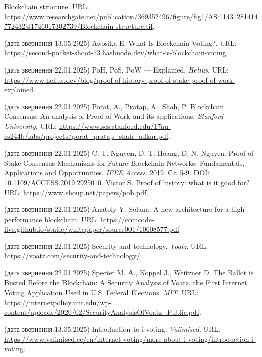 \documentclass[14pt]{extreport}
\begin{document}
  \renewcommand\bibname{\MakeUppercase{Список літератури}}
  \begin{thebibliography}{99}
     Blockchain structure. URL: \url{https://www.researchgate.net/publication/369352496/figure/fig1/AS:11431281414772432@1746017302739/Blockchain-structure.tif}.

    (дата звернення 13.05.2025)
     Awosika E. What Is Blockchain Voting?. URL: \url{https://second-pocket-shoot-73.hashnode.dev/what-is-blockchain-voting}.

    (дата звернення 22.01.2025)
     PoH, PoS, PoW — Explained. \textit{Helius}. URL: \url{https://www.helius.dev/blog/proof-of-history-proof-of-stake-proof-of-work-explained}.
    
    (дата звернення 22.01.2025)
     Porat, A., Pratap, A., Shah, P. Blockchain Consensus: An analysis of Proof-of-Work and its applications. \textit{Stanford University}. URL: \url{https://www.scs.stanford.edu/17au-cs244b/labs/projects/porat_pratap_shah_adkar.pdf}.
    
    (дата звернення 22.01.2025)
     C. T. Nguyen, D. T. Hoang, D. N. Nguyen. Proof-of-Stake Consensus Mechanisms for Future Blockchain Networks: Fundamentals, Applications and Opportunities. \textit{IEEE Access}. 2019. Ст. 5-9. DOI: 10.1109/ACCESS.2019.2925010.
     Victor S. Proof of history: what is it good for? URL: \url{https://www.shoup.net/papers/poh.pdf}.
    
    (дата звернення 22.01.2025)
     Anatoly Y. Solana: A new architecture for a high performance blockchain. URL: \url{https://coincode-live.github.io/static/whitepaper/source001/10608577.pdf}
    
    (дата звернення 22.01.2025)
     Security and technology. \textit{Voatz}. URL: \url{https://voatz.com/security-and-technology/}.
    
    (дата звернення 22.01.2025)
     Specter M. A., Koppel J., Weitzner D. The Ballot is Busted Before the Blockchain: A Security Analysis of Voatz, the First Internet Voting Application Used in U.S. Federal Elections. \textit{MIT}. URL: \url{https://internetpolicy.mit.edu/wp-content/uploads/2020/02/SecurityAnalysisOfVoatz_Public.pdf}.

    (дата звернення 13.05.2025)
     Introduction to i-voting. \textit{Valimised}. 
    URL: \url{https://www.valimised.ee/en/internet-voting/more-about-i-voting/introduction-i-voting}.
    

\end{thebibliography}
\end{document}
